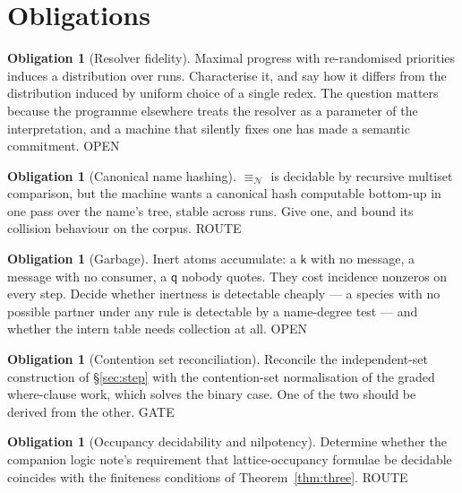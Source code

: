 \documentclass[11pt,a4paper]{article}
\theoremstyle{plain}
\theoremstyle{definition}
\newtheorem{obligation}[theorem]{Obligation}
\theoremstyle{remark}
\newcommand{\nequiv}{\equiv_{\mathcal{N}}}
\newcommand{\kk}{\mathsf{k}}
\newcommand{\qq}{\mathsf{q}}
\begin{document}
\section{Obligations}
\label{sec:obligations}

\begin{obligation}[Resolver fidelity]
\label{obl:resolver}
Maximal progress with re-randomised priorities induces a distribution over
runs. Characterise it, and say how it differs from the distribution induced by
uniform choice of a single redex. The question matters because the programme
elsewhere treats the resolver as a parameter of the interpretation, and a
machine that silently fixes one has made a semantic commitment.
\textsf{OPEN}
\end{obligation}

\begin{obligation}[Canonical name hashing]
\label{obl:hash}
$\nequiv$ is decidable by recursive multiset comparison, but the machine wants
a canonical hash computable bottom-up in one pass over the name's tree, stable
across runs. Give one, and bound its collision behaviour on the corpus.
\textsf{ROUTE}
\end{obligation}

\begin{obligation}[Garbage]
\label{obl:gc}
Inert atoms accumulate: a $\kk$ with no message, a message with no consumer, a
$\qq$ nobody quotes. They cost incidence nonzeros on every step. Decide
whether inertness is detectable cheaply --- a species with no possible partner
under any rule is detectable by a name-degree test --- and whether the intern
table needs collection at all. \textsf{OPEN}
\end{obligation}

\begin{obligation}[Contention set reconciliation]
\label{obl:contention}
Reconcile the independent-set construction of \S\ref{sec:step} with the
contention-set normalisation of the graded where-clause work, which solves the
binary case. One of the two should be derived from the other. \textsf{GATE}
\end{obligation}

\begin{obligation}[Occupancy decidability and nilpotency]
\label{obl:occupancy}
Determine whether the companion logic note's requirement that
lattice-occupancy formulae be decidable coincides with the finiteness
conditions of Theorem~\ref{thm:three}. \textsf{ROUTE}
\end{obligation}
\end{document}
